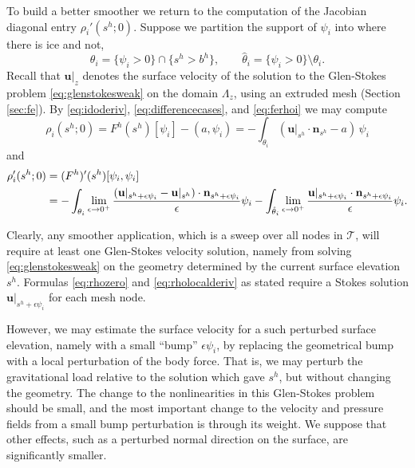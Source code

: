 \documentclass[letterpaper,final,12pt,reqno]{amsart}
\theoremstyle{claim}
\newcommand{\eps}{\epsilon}
\newcommand{\bn}{\mathbf{n}}
\newcommand{\bu}{\mathbf{u}}
\newcommand{\ip}[2]{\left(#1,#2\right)}
\numberwithin{equation}{section}
\numberwithin{figure}{section}
\numberwithin{table}{section}
\numberwithin{theorem}{section}
\begin{document}
To build a better smoother we return to the computation of the Jacobian diagonal entry $\rho_i'(s^h; 0)$.  Suppose we partition the support of $\psi_i$ into where there is ice and not,
\begin{equation}
\theta_i = \{\psi_i > 0\} \cap \{s^h > b^h\}, \qquad {\hat\theta}_i = \{\psi_i > 0\} \setminus \theta_i.  \label{eq:thetasupport}
\end{equation}
Recall that $\bu|_{z}$ denotes the surface velocity of the solution to the Glen-Stokes problem \eqref{eq:glenstokesweak} on the domain $\Lambda_{z}$, using an extruded mesh (Section \ref{sec:fe}).  By \eqref{eq:idoderiv}, \eqref{eq:differencecases}, and \eqref{eq:ferhoi} we may compute
\begin{equation}
\rho_i(s^h; 0) = F^h(s^h)[\psi_i] - \ip{a}{\psi_i} = - \int_{\theta_i} (\bu|_{s^h} \cdot \bn_{s^h}- a)\, \psi_i  \label{eq:rhozero}
\end{equation}
and
\begin{align}
\rho_i'(s^h; 0) &= (F^h)'(s^h)[\psi_i,\psi_i]  \label{eq:rholocalderiv} \\
  &= - \int_{\theta_i} \lim_{\eps\to 0^+} \frac{(\bu|_{s^h+\eps\psi_i} - \bu|_{s^h}) \cdot \bn_{s^h+\eps\psi_i}}{\eps} \psi_i - \int_{{\hat\theta}_i} \lim_{\eps\to 0^+} \frac{\bu|_{s^h+\eps\psi_i} \cdot \bn_{s^h+\eps\psi_i}}{\eps} \psi_i.  \notag
\end{align}

Clearly, any smoother application, which is a sweep over all nodes in $\mathcal{T}$, will require at least one Glen-Stokes velocity solution, namely from solving \eqref{eq:glenstokesweak} on the geometry determined by the current surface elevation $s^h$.  Formulas \eqref{eq:rhozero} and \eqref{eq:rholocalderiv} as stated require a Stokes solution $\bu|_{s^h+\eps\psi_i}$ for each mesh node.

However, we may estimate the surface velocity for a such perturbed surface elevation, namely with a small ``bump'' $\eps\psi_i$, by replacing the geometrical bump with a local perturbation of the body force.  That is, we may perturb the gravitational load relative to the solution which gave $s^h$, but without changing the geometry.  The change to the nonlinearities in this Glen-Stokes problem should be small, and the most important change to the velocity and pressure fields from a small bump perturbation is through its weight.  We suppose that other effects, such as a perturbed normal direction on the surface, are significantly smaller.
\end{document}
